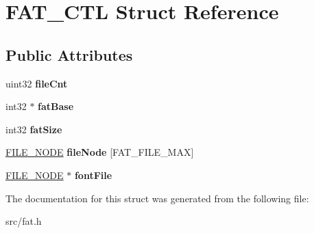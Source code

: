 \hypertarget{struct_f_a_t___c_t_l}{}\section{F\+A\+T\+\_\+\+C\+T\+L Struct Reference}
\label{struct_f_a_t___c_t_l}
\subsection*{Public Attributes}
\begin{DoxyCompactItemize}
\item 
\hypertarget{struct_f_a_t___c_t_l_a09b77de4044d5d1b2ce67d0f12b90928}{}uint32 {\bfseries file\+Cnt}\label{struct_f_a_t___c_t_l_a09b77de4044d5d1b2ce67d0f12b90928}

\item 
\hypertarget{struct_f_a_t___c_t_l_a24d7fe7523f27715356cb2031d96f27d}{}int32 $\ast$ {\bfseries fat\+Base}\label{struct_f_a_t___c_t_l_a24d7fe7523f27715356cb2031d96f27d}

\item 
\hypertarget{struct_f_a_t___c_t_l_a43eeaf9c473c1be462c149e974912ad9}{}int32 {\bfseries fat\+Size}\label{struct_f_a_t___c_t_l_a43eeaf9c473c1be462c149e974912ad9}

\item 
\hypertarget{struct_f_a_t___c_t_l_a94e359cb49ec4148d3b5100d12bc6517}{}\hyperlink{struct_f_i_l_e___n_o_d_e}{F\+I\+L\+E\+\_\+\+N\+O\+D\+E} {\bfseries file\+Node} \mbox{[}F\+A\+T\+\_\+\+F\+I\+L\+E\+\_\+\+M\+A\+X\mbox{]}\label{struct_f_a_t___c_t_l_a94e359cb49ec4148d3b5100d12bc6517}

\item 
\hypertarget{struct_f_a_t___c_t_l_a4a0b4177fb84b7316e63ea3c08bc41b1}{}\hyperlink{struct_f_i_l_e___n_o_d_e}{F\+I\+L\+E\+\_\+\+N\+O\+D\+E} $\ast$ {\bfseries font\+File}\label{struct_f_a_t___c_t_l_a4a0b4177fb84b7316e63ea3c08bc41b1}

\end{DoxyCompactItemize}


The documentation for this struct was generated from the following file\+:\begin{DoxyCompactItemize}
\item 
src/fat.\+h\end{DoxyCompactItemize}
